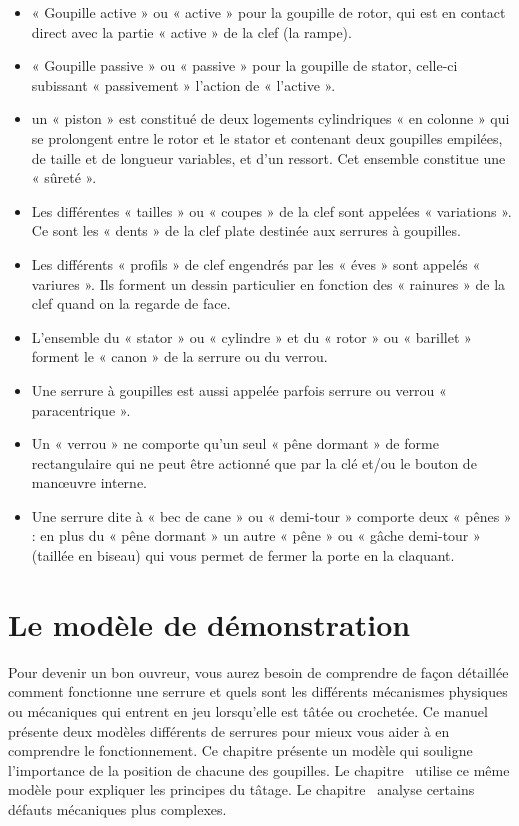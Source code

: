\documentclass[a4paper,french,11pt,twoside]{report}
\begin{document}
\begin{itemize}
	\item{« Goupille active » ou « active » pour la goupille de rotor, qui est en contact direct avec la partie « active » de la clef (la rampe).}
	\item{« Goupille passive » ou « passive » pour la goupille de stator, celle-ci subissant « passivement » l'action de « l'active ».}
	\item{un « piston » est constitué de deux logements cylindriques « en colonne » qui se prolongent entre le rotor et le stator et contenant deux goupilles empilées, de taille et de longueur variables, et d'un ressort. Cet ensemble constitue une « sûreté ».}
	\item{Les différentes « tailles » ou « coupes » de la clef sont appelées « variations ». Ce sont les « dents » de la clef plate destinée aux serrures à goupilles.}
	\item{Les différents « profils » de clef engendrés par les « éves » sont appelés « variures ». Ils forment un dessin particulier en fonction des « rainures » de la clef quand on la regarde de face.}
	\item{L'ensemble du « stator » ou « cylindre » et du « rotor » ou « barillet » forment le « canon » de la serrure ou du verrou.}
    \item{Une serrure à goupilles est aussi appelée parfois serrure ou verrou « paracentrique ».}
	\item{Un « verrou » ne comporte qu'un seul « pêne dormant » de forme rectangulaire qui ne peut être actionné que par la clé et/ou le bouton de manœuvre interne.}
	\item{Une serrure dite à « bec de cane » ou « demi-tour » comporte deux « pênes » : en plus du « pêne dormant » un autre « pêne » ou « gâche demi-tour » (taillée en biseau) qui vous permet de fermer la porte en la claquant.}
\end{itemize}


\chapter{\label{chap:modele_demonstration}Le modèle de démonstration}

Pour devenir un bon ouvreur, vous aurez besoin de comprendre de façon détaillée comment fonctionne une serrure et quels sont les différents mécanismes physiques ou mécaniques qui entrent en jeu lorsqu'elle est tâtée ou crochetée. Ce manuel présente deux modèles différents de serrures pour mieux vous aider à en comprendre le fonctionnement. Ce chapitre présente un modèle qui souligne l'importance de la position de chacune des goupilles. Le chapitre~ utilise ce même modèle pour expliquer les principes du tâtage. Le chapitre~ analyse certains défauts mécaniques plus complexes.
\end{document}
